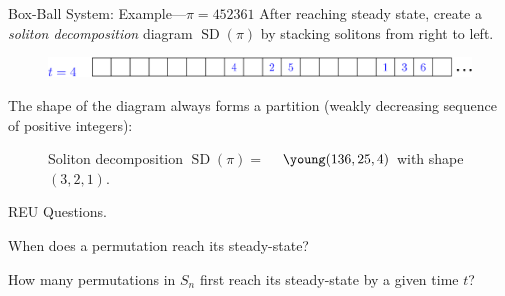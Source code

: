 \documentclass[aspectratio=169, serif]{beamer}
\DeclareMathOperator{\SD}{SD}
\begin{document}
    \begin{frame}{Box-Ball System: Example---$\pi=452361$}
        \phantom{---}After reaching steady state, 
        create a \emph{soliton decomposition} diagram $\SD(\pi)$ by stacking solitons from right to left. \\
        \begin{figure}
            \centering
            \includegraphics[width = 5in]{Step5.eps}
        \end{figure}
        The shape of the diagram always forms a partition (weakly decreasing sequence of positive integers): \\
        \begin{figure}
            \centering
            Soliton decomposition $\SD(\pi) = $
            ~
            $\young(136,25,4)$  with shape $(3,2,1)$.
        \end{figure}
    \begin{block}{REU Questions.}
    
    When does a permutation reach its steady-state?
    
    How many permutations in $S_n$ first reach its steady-state by a given time $t$? 
    
    \end{block}
    \end{frame}
\end{document}
